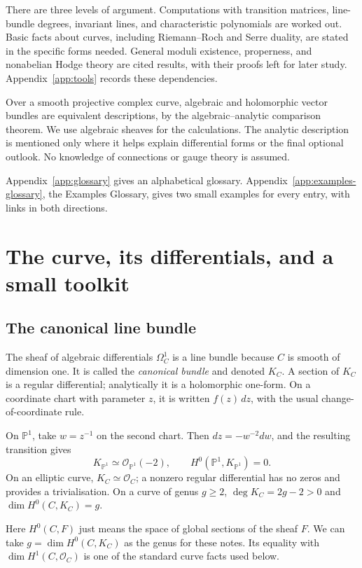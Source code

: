 \documentclass[11pt,a4paper]{article}
\numberwithin{equation}{section}
\theoremstyle{definition}
\newcommand{\OO}{\mathcal O}
\newcommand{\PP}{\mathbb P}
\begin{document}
There are three levels of argument. Computations with transition matrices,
line-bundle degrees, invariant lines, and characteristic polynomials are
worked out. Basic facts about curves, including Riemann--Roch and Serre
duality, are stated in the specific forms needed. General moduli existence,
properness, and nonabelian Hodge theory are cited results, with their
proofs left for later study. Appendix~\ref{app:tools} records these dependencies.

Over a smooth projective complex curve, algebraic and holomorphic vector
bundles are equivalent descriptions, by the algebraic--analytic comparison
theorem. We use algebraic sheaves for the calculations. The analytic
description is mentioned only where it helps explain differential forms
or the final optional outlook. No knowledge of connections or gauge
theory is assumed.

Appendix~\ref{app:glossary} gives an alphabetical glossary.
Appendix~\ref{app:examples-glossary}, the Examples Glossary, gives two small
examples for every entry, with links in both directions.

\section{The curve, its differentials, and a small toolkit}
\label{sec:curves}

\subsection{The canonical line bundle}
The sheaf of algebraic differentials $\Omega_C^1$ is a line bundle because
$C$ is smooth of dimension one. It is called the \emph{canonical bundle}
and denoted $K_C$. A section of $K_C$ is a regular differential; analytically
it is a holomorphic one-form. On a coordinate chart with parameter $z$,
it is written $f(z)\,dz$, with the usual change-of-coordinate rule.

On $\PP^1$, take $w=z^{-1}$ on the second chart. Then
$dz=-w^{-2}dw$, and the resulting transition gives
\[
 K_{\PP^1}\simeq\OO_{\PP^1}(-2),\qquad H^0(\PP^1,K_{\PP^1})=0.
\]
On an elliptic curve, $K_C\simeq\OO_C$; a nonzero regular differential
has no zeros and provides a trivialisation. On a curve of genus $g\ge2$,
$\deg K_C=2g-2>0$ and $\dim H^0(C,K_C)=g$.

Here $H^0(C,F)$ just means the space of global sections of the sheaf $F$.
We can take $g=\dim H^0(C,K_C)$ as the genus for these notes. Its equality
with $\dim H^1(C,\OO_C)$ is one of the standard curve facts used below.
\end{document}
